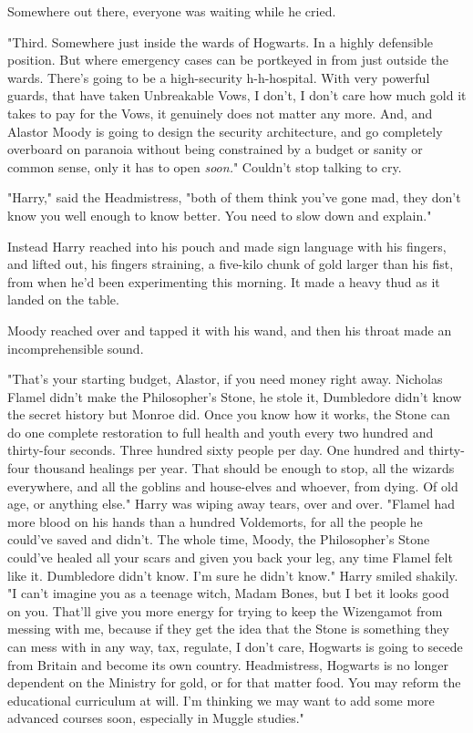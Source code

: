 Somewhere out there, everyone was waiting while he cried.

"Third. Somewhere just inside the wards of Hogwarts. In a highly defensible
position. But where emergency cases can be portkeyed in from just outside the
wards. There's going to be a high-security h-h-hospital. With very powerful
guards, that have taken Unbreakable Vows, I don't, I don't care how much gold
it takes to pay for the Vows, it genuinely does not matter any more. And, and
Alastor Moody is going to design the security architecture, and go completely
overboard on paranoia without being constrained by a budget or sanity or common
sense, only it has to open \emph{soon.}" Couldn't stop talking to cry.

"Harry," said the Headmistress, "both of them think you've gone mad, they don't
know you well enough to know better. You need to slow down and explain."

Instead Harry reached into his pouch and made sign language with his fingers,
and lifted out, his fingers straining, a five-kilo chunk of gold larger than
his fist, from when he'd been experimenting this morning. It made a heavy thud
as it landed on the table.

Moody reached over and tapped it with his wand, and then his throat made an
incomprehensible sound.

"That's your starting budget, Alastor, if you need money right away. Nicholas
Flamel didn't make the Philosopher's Stone, he stole it, Dumbledore didn't know
the secret history but Monroe did. Once you know how it works, the Stone can do
one complete restoration to full health and youth every two hundred and
thirty-four seconds. Three hundred sixty people per day. One hundred and
thirty-four thousand healings per year. That should be enough to stop, all the
wizards everywhere, and all the goblins and house-elves and whoever, from
dying. Of old age, or anything else." Harry was wiping away tears, over and
over. "Flamel had more blood on his hands than a hundred Voldemorts, for all
the people he could've saved and didn't. The whole time, Moody, the
Philosopher's Stone could've healed all your scars and given you back your leg,
any time Flamel felt like it. Dumbledore didn't know. I'm sure he didn't know."
Harry smiled shakily. "I can't imagine you as a teenage witch, Madam Bones, but
I bet it looks good on you. That'll give you more energy for trying to keep the
Wizengamot from messing with me, because if they get the idea that the Stone is
something they can mess with in any way, tax, regulate, I don't care, Hogwarts
is going to secede from Britain and become its own country. Headmistress,
Hogwarts is no longer dependent on the Ministry for gold, or for that matter
food. You may reform the educational curriculum at will. I'm thinking we may
want to add some more advanced courses soon, especially in Muggle studies."

